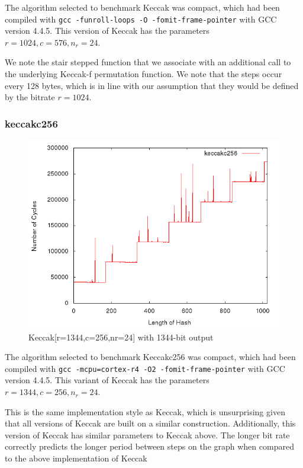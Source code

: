 The algorithm selected to benchmark Keccak was compact, which had been compiled
with \texttt{gcc -funroll-loops -O -fomit-frame-pointer} with GCC version 4.4.5.
This version of Keccak has the parameters $ r = 1024, c = 576, n_r = 24$.

We note the stair stepped function that we associate with an additional call to
the underlying Keccak-f permutation function. We note that the steps occur every
128 bytes, which is in line with our assumption that they would be defined by
the bitrate $r = 1024$. 


\subsubsection{keccakc256}
\begin{figure}[H]
    \begin{center}
        \includegraphics[scale=0.5]{images/keccakc256.png} 
        \caption{Keccak[r=1344,c=256,nr=24] with 1344-bit output}
    \end{center}
\end{figure}

The algorithm selected to benchmark Keccakc256 was compact, which had been
compiled with \texttt{gcc -mcpu=cortex-r4 -O2 -fomit-frame-pointer} with GCC
version 4.4.5. This variant of Keccak has the parameters $r=1344,c=256,n_r=24$.


This is the same implementation style as Keccak, which is unsurprising given
that all versions of Keccak are built on a similar construction. Additionally,
this version of Keccak has similar parameters to Keccak above. The longer
bit rate correctly predicts the longer period between steps on the graph when
compared to the above implementation of Keccak


